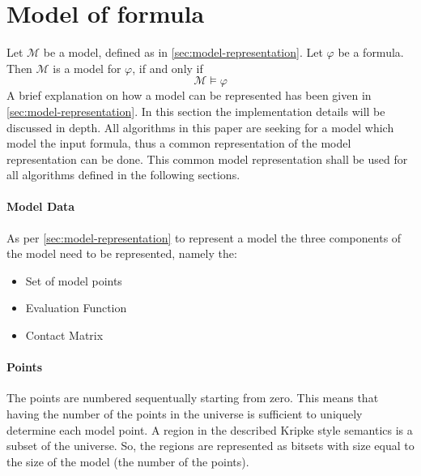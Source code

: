 \documentclass{article}
\begin{document}
	\section{Model of formula}
		Let $\mathcal{M}$ be a model, defined as in \ref{sec:model-representation}. Let $\varphi$ be a formula. Then 
		$\mathcal{M}$ is a model for $\varphi$, if and only if 
		\begin{equation}
			\mathcal{M} \models \varphi
		\end{equation}
		A brief explanation on how a model can be represented has been given in \ref{sec:model-representation}. In this section the implementation details will be discussed in depth. All algorithms in this paper are seeking for a model which model the input formula, thus a common representation of the model representation can be done. This common model representation shall be used for all algorithms defined in the following sections.
		\paragraph{Model Data} As per \ref{sec:model-representation} to represent a model the three components of the model need to be represented, namely the: 
			\begin{itemize}
				\item Set of model points
				\item Evaluation Function
				\item Contact Matrix 
			\end{itemize}
		\paragraph{Points} The points are numbered sequentually starting from zero. This means that having the number 
			of the points in the universe is sufficient to uniquely determine each model point.
			A region in the described Kripke style semantics is a subset of the universe. So, the regions are represented as bitsets with size
			equal to the size of the model (the number of the points).
				
\end{document}
